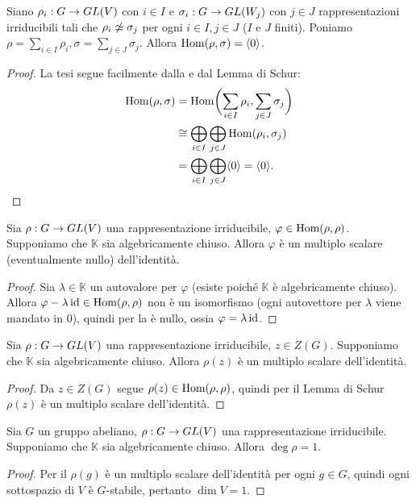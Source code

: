 \begin{corollary}
Siano $\rho_i:G\to GL(V)$ con $i\in I$ e $\sigma_i:G\to GL(W_j)$ con $j\in J$ rappresentazioni irriducibili tali che $\rho_i\not\simeq\sigma_j$ per ogni $i\in I\comma j\in J$ ($I$ e $J$ finiti). Poniamo $\rho=\sum_{i\in I}\rho_i\comma\sigma=\sum_{j\in J}\sigma_j$. Allora $\operatorname{Hom}(\rho,\sigma)=\langle 0\rangle$.
\end{corollary}
\begin{proof}
La tesi segue facilmente dalla  e dal Lemma di Schur:
\begin{align*}
\operatorname{Hom}(\rho,\sigma)&=\operatorname{Hom}\biggl(\sum_{i\in I}\rho_i,\sum_{j\in J}\sigma_j\biggr)\\
&\cong\bigoplus_{i\in I}\bigoplus_{j\in J}\operatorname{Hom}(\rho_i,\sigma_j)\\
&=\bigoplus_{i\in I}\bigoplus_{j\in J}\langle 0\rangle=\langle 0\rangle.
\end{align*}
\end{proof}

\begin{proposition}
Sia $\rho:G\to GL(V)$ una rappresentazione irriducibile, $\varphi\in\operatorname{Hom}(\rho,\rho)$. Supponiamo che $\mathbb{K}$ sia algebricamente chiuso. Allora $\varphi$ è un multiplo scalare (eventualmente nullo) dell'identità.
\end{proposition}
\begin{proof}
Sia $\lambda\in\mathbb{K}$ un autovalore per $\varphi$ (esiste poiché $\mathbb{K}$ è algebricamente chiuso). Allora $\varphi-\lambda\operatorname{id}\in\operatorname{Hom}(\rho,\rho)$ non è un isomorfismo (ogni autovettore per $\lambda$ viene mandato in 0), quindi per la  è nullo, ossia $\varphi=\lambda\operatorname{id}$.
\end{proof}

\begin{corollary}
Sia $\rho:G\to GL(V)$ una rappresentazione irriducibile, $z\in Z(G)$. Supponiamo che $\mathbb{K}$ sia algebricamente chiuso. Allora $\rho(z)$ è un multiplo scalare dell'identità.
\end{corollary}
\begin{proof}
Da $z\in Z(G)$ segue $\rho(z)\in\operatorname{Hom}(\rho,\rho)$, quindi per il Lemma di Schur $\rho(z)$ è un multiplo scalare dell'identità.
\end{proof}

\begin{corollary}
Sia $G$ un gruppo abeliano, $\rho:G\to GL(V)$ una rappresentazione irriducibile. Supponiamo che $\mathbb{K}$ sia algebricamente chiuso. Allora $\deg\rho=1$.
\end{corollary}
\begin{proof}
Per il  $\rho(g)$ è un multiplo scalare dell'identità per ogni $g\in G$, quindi ogni sottospazio di $V$ è $G$-stabile, pertanto $\dim V=1$.
\end{proof}

